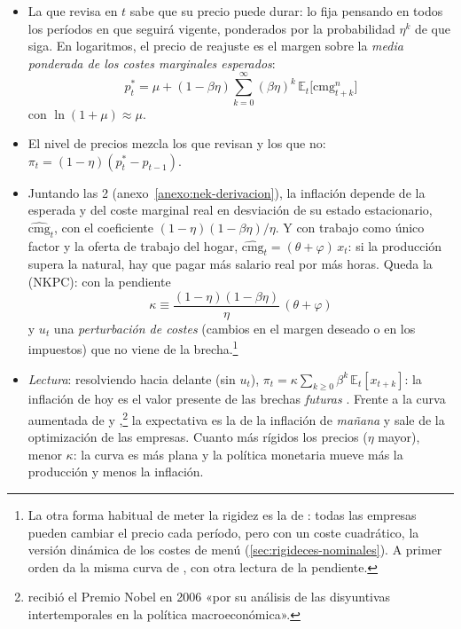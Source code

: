 \documentclass[11pt]{article}
\begin{document}
\begin{itemize}
  \begin{itemize}
  \item La que revisa en $t$ sabe que su precio puede durar: lo fija pensando en todos los períodos en que seguirá vigente, ponderados por la probabilidad $\eta^k$ de que siga. En logaritmos, el precio de reajuste es el margen sobre la \emph{media ponderada de los costes marginales esperados}:
    \begin{equation}
    p^*_t=\mu+(1-\beta\eta)\sum_{k=0}^{\infty}(\beta\eta)^k\,\mathbb{E}_t\big[\mathrm{cmg}^n_{t+k}\big] \label{eq:precio-reajuste}
    \end{equation}
    con $\ln(1+\mu)\approx\mu$.
  \item El nivel de precios mezcla los que revisan y los que no: $\pi_t=(1-\eta)(p^*_t-p_{t-1})$.
  \item Juntando las 2 (anexo~\ref{anexo:nek-derivacion}), la inflación depende de la esperada y del coste marginal real en desviación de su estado estacionario, $\widehat{\mathrm{cmg}}_t$, con el coeficiente $(1-\eta)(1-\beta\eta)/\eta$. Y con trabajo como único factor y la oferta de trabajo del hogar, $\widehat{\mathrm{cmg}}_t=(\theta+\varphi)\,x_t$: si la producción supera la natural, hay que pagar más salario real por más horas. Queda la  (NKPC):
    con la pendiente
    \begin{equation}
    \kappa\equiv\frac{(1-\eta)(1-\beta\eta)}{\eta}\,(\theta+\varphi) \label{eq:kappa}
    \end{equation}
    y $u_t$ una \emph{perturbación de costes} (cambios en el margen deseado o en los impuestos) que no viene de la brecha\nocite{ClaridaGaliGertler1999Science}.\footnote{La otra forma habitual de meter la rigidez es la de \textcite{Rotemberg1982Monopolistic}: todas las empresas pueden cambiar el precio cada período, pero con un coste cuadrático, la versión dinámica de los costes de menú (\ref{sec:rigideces-nominales}). A primer orden da la misma curva de , con otra lectura de la pendiente.}
  \item \emph{Lectura}: resolviendo hacia delante (sin $u_t$), $\pi_t=\kappa\sum_{k\geq0}\beta^k\,\mathbb{E}_t[x_{t+k}]$: la inflación de hoy es el valor presente de las brechas \emph{futuras} . Frente a la curva aumentada de  y  ,\footnote{ recibió el Premio Nobel en 2006 «por su análisis de las disyuntivas intertemporales en la política macroeconómica»\nocite{Nobel2006Phelps}.} la expectativa es la de la inflación de \emph{mañana} y sale de la optimización de las empresas. Cuanto más rígidos los precios ($\eta$ mayor), menor $\kappa$: la curva es más plana y la política monetaria mueve más la producción y menos la inflación.

\end{itemize}
\end{itemize}
\end{document}
